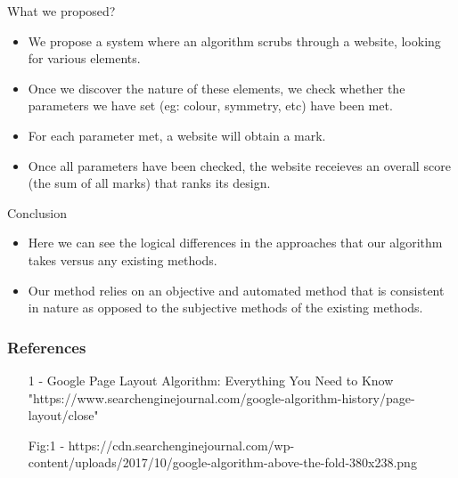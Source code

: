 \documentclass[11pt]{beamer}
\begin{document}
		\begin{frame}{What we proposed?}
			\begin{itemize}
				\item We propose a system where an algorithm scrubs through a website, looking for various elements.
				\item Once we discover the nature of these elements, we check whether the parameters we have set (eg: colour, symmetry, etc) have been met.
				\item For each parameter met, a website will obtain a mark.
				\item Once all parameters have been checked, the website receieves an overall score (the sum of all marks) that ranks its design.
					\end{itemize}	
	\end{frame}
	\begin{frame}{Conclusion}
		\begin{itemize}
			\item Here we can see the logical differences in the approaches that our algorithm takes versus any existing methods.
			\item Our method relies on an objective and automated method that is consistent in nature as opposed to the subjective methods of the existing methods.
		\end{itemize}
	\end{frame}
	\begin{frame}
		\frametitle{\LARGE \textbf{References}}
		\begin{itemize}
			\item [1] - Google Page Layout Algorithm: Everything You Need to Know 
			"https://www.searchenginejournal.com/google-algorithm-history/page-layout/close"
			\item [Fig:1] - https://cdn.searchenginejournal.com/wp-content/uploads/2017/10/google-algorithm-above-the-fold-380x238.png
		\end{itemize}
	\end{frame}
\end{document}
